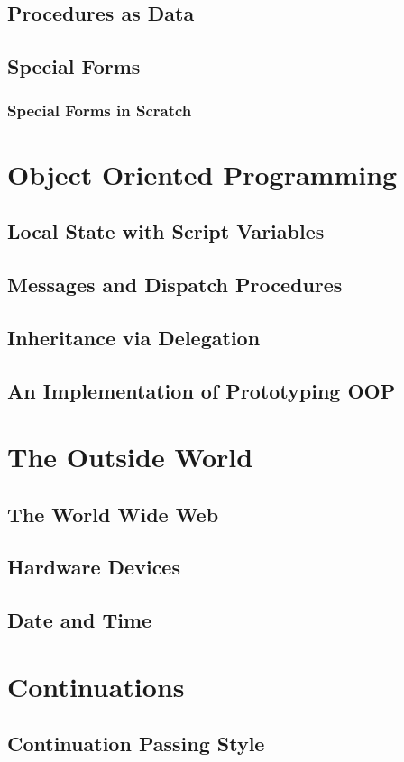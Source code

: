 \documentclass[a4paper]{report}
\begin{document}
\section{Procedures as Data}
\section{Special Forms}
\subsection{Special Forms in Scratch}
\chapter{Object Oriented Programming}
\section{Local State with Script Variables}
\section{Messages and Dispatch Procedures}
\section{Inheritance via Delegation}
\section{An Implementation of Prototyping OOP}
\chapter{The Outside World}
\section{The World Wide Web}
\section{Hardware Devices}
\section{Date and Time}
\chapter{Continuations}
\section{Continuation Passing Style}
\end{document}
